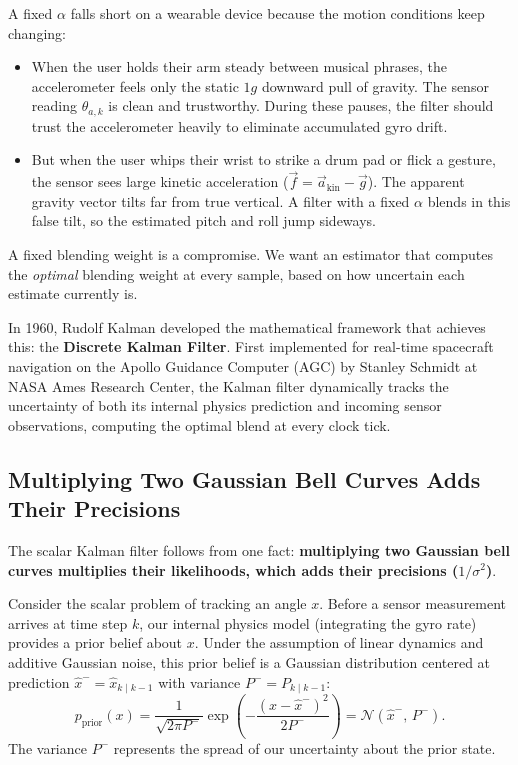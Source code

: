 A fixed $\alpha$ falls short on a wearable device because the motion conditions keep changing:
\begin{itemize}
  \item When the user holds their arm steady between musical phrases, the accelerometer feels only the static $1g$ downward pull of gravity. The sensor reading $\theta_{a,k}$ is clean and trustworthy. During these pauses, the filter should trust the accelerometer heavily to eliminate accumulated gyro drift.
  \item But when the user whips their wrist to strike a drum pad or flick a gesture, the sensor sees large kinetic acceleration ($\vec{f} = \vec{a}_{\text{kin}} - \vec{g}$). The apparent gravity vector tilts far from true vertical. A filter with a fixed $\alpha$ blends in this false tilt, so the estimated pitch and roll jump sideways.
\end{itemize}

A fixed blending weight is a compromise. We want an estimator that computes the \emph{optimal} blending weight at every sample, based on how uncertain each estimate currently is.

In 1960, Rudolf Kalman developed the mathematical framework that achieves this: the \textbf{Discrete Kalman Filter}. First implemented for real-time spacecraft navigation on the Apollo Guidance Computer (AGC) by Stanley Schmidt at NASA Ames Research Center, the Kalman filter dynamically tracks the uncertainty of both its internal physics prediction and incoming sensor observations, computing the optimal blend at every clock tick.

\subsection{Multiplying Two Gaussian Bell Curves Adds Their Precisions}
\label{ch36:kalman-precision}

The scalar Kalman filter follows from one fact: \textbf{multiplying two Gaussian bell curves multiplies their likelihoods, which adds their precisions ($1/\sigma^2$)}.

Consider the scalar problem of tracking an angle $x$. Before a sensor measurement arrives at time step $k$, our internal physics model (integrating the gyro rate) provides a prior belief about $x$. Under the assumption of linear dynamics and additive Gaussian noise, this prior belief is a Gaussian distribution centered at prediction $\hat{x}^- = \hat{x}_{k\mid k-1}$ with variance $P^- = P_{k\mid k-1}$:
\begin{equation}
  p_{\text{prior}}(x) = \frac{1}{\sqrt{2\pi P^-}} \exp\left( -\frac{(x - \hat{x}^-)^2}{2 P^-} \right) = \mathcal{N}(\hat{x}^-,\, P^-) .
  \label{ch36:eq-prior-gauss}
\end{equation}
The variance $P^-$ represents the spread of our uncertainty about the prior state.

